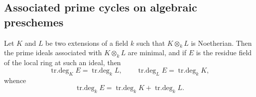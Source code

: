 \subsection{Associated prime cycles on algebraic preschemes}
\label{subsection:IV.4.2}

\begin{proposition}[4.2.1]
\label{IV.4.2.1}
Let $K$ and $L$ be two extensions of a field $k$ such that
$K\otimes_k L$ is Noetherian.
Then the prime ideals associated with $K\otimes_k L$ are minimal, and if
$E$ is the residue field of the local ring at such an ideal, then
\begin{equation}
\operatorname{tr.deg}_K E=\operatorname{tr.deg}_k L,
\qquad
\operatorname{tr.deg}_L E=\operatorname{tr.deg}_k K,
\tag{4.2.1.1}
\label{IV.4.2.1.1}
\end{equation}
whence
\begin{equation}
\operatorname{tr.deg}_k E
=\operatorname{tr.deg}_k K+\operatorname{tr.deg}_k L.
\tag{4.2.1.2}
\label{IV.4.2.1.2}
\end{equation}
\end{proposition}

